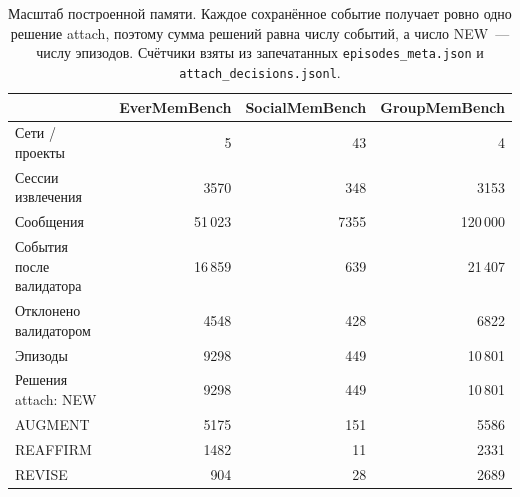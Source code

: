 \documentclass[11pt,a4paper]{article}
\begin{document}
\begin{table}[ht]
\centering\small
\begin{tabular}{@{}lrrr@{}}
\toprule
 & EverMemBench & SocialMemBench & GroupMemBench\\
\midrule
Сети / проекты & 5 & 43 & 4\\
Сессии извлечения & 3570 & 348 & 3153\\
Сообщения & 51\,023 & 7355 & 120\,000\\
События после валидатора & 16\,859 & 639 & 21\,407\\
Отклонено валидатором & 4548 & 428 & 6822\\
Эпизоды & 9298 & 449 & 10\,801\\
Решения attach: NEW & 9298 & 449 & 10\,801\\
\quad AUGMENT & 5175 & 151 & 5586\\
\quad REAFFIRM & 1482 & 11 & 2331\\
\quad REVISE & 904 & 28 & 2689\\
\bottomrule
\end{tabular}
\caption{Масштаб построенной памяти. Каждое сохранённое событие получает ровно одно
решение attach, поэтому сумма решений равна числу событий, а число NEW~--- числу
эпизодов. Счётчики взяты из запечатанных \texttt{episodes\_meta.json} и
\texttt{attach\_decisions.jsonl}.}
\label{tab:memory-scale}
\end{table}
\end{document}
